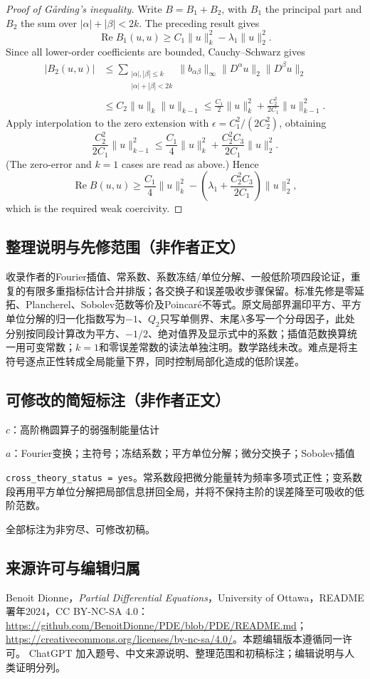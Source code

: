 \documentclass[UTF8,11pt]{ctexart}
\theoremstyle{definition}
\begin{document}
\begin{proof}[Proof of G\aa rding's inequality]
Write $B=B_1+B_2$, with $B_1$ the principal part and $B_2$ the sum over
$|\alpha|+|\beta|<2k$. The preceding result gives
\[
\operatorname{Re}B_1(u,u)\geq C_1\|u\|_k^2-\lambda_1\|u\|_2^2.
\]
Since all lower-order coefficients are bounded, Cauchy--Schwarz gives
\begin{align*}
|B_2(u,u)|
&\leq\sum_{\substack{|\alpha|,|\beta|\leq k\\|\alpha|+|\beta|<2k}}
 \|b_{\alpha\beta}\|_\infty\|D^\alpha u\|_2\|D^\beta u\|_2\\
&\leq C_2\|u\|_k\|u\|_{k-1}
\leq\frac{C_1}{2}\|u\|_k^2+\frac{C_2^2}{2C_1}\|u\|_{k-1}^2.
\end{align*}
Apply interpolation to the zero extension with
$\epsilon=C_1^2/(2C_2^2)$, obtaining
\[
\frac{C_2^2}{2C_1}\|u\|_{k-1}^2
\leq\frac{C_1}{4}\|u\|_k^2+\frac{C_2^2C_3}{2C_1}\|u\|_2^2.
\]
(The zero-error and $k=1$ cases are read as above.) Hence
\[
\operatorname{Re}B(u,u)\geq\frac{C_1}{4}\|u\|_k^2-
\left(\lambda_1+\frac{C_2^2C_3}{2C_1}\right)\|u\|_2^2,
\]
which is the required weak coercivity.
\end{proof}

\subsection*{整理说明与先修范围（非作者正文）}
收录作者的Fourier插值、常系数、系数冻结/单位分解、一般低阶项四段论证，重复的有限多重指标估计合并排版；各交换子和误差吸收步骤保留。标准先修是零延拓、Plancherel、Sobolev范数等价及Poincar\'e不等式。原文局部界漏印平方、平方单位分解的归一化指数写为$-1$、$Q_2$只写单侧界、末尾$\lambda$多写一个分母因子，此处分别按同段计算改为平方、$-1/2$、绝对值界及显示式中的系数；插值范数换算统一用可变常数；$k=1$和零误差常数的读法单独注明。数学路线未改。难点是将主符号逐点正性转成全局能量下界，同时控制局部化造成的低阶误差。
\subsection*{可修改的简短标注（非作者正文）}
$c$：高阶椭圆算子的弱强制能量估计

$a$：Fourier变换；主符号；冻结系数；平方单位分解；微分交换子；Sobolev插值

\texttt{cross\_theory\_status = yes}。常系数段把微分能量转为频率多项式正性；变系数段再用平方单位分解把局部信息拼回全局，并将不保持主阶的误差降至可吸收的低阶范数。

全部标注为非穷尽、可修改初稿。
\subsection*{来源许可与编辑归属}
Benoit Dionne，\emph{Partial Differential Equations}，University of Ottawa，README署年2024，CC BY-NC-SA 4.0：\url{https://github.com/BenoitDionne/PDE/blob/PDE/README.md}；\url{https://creativecommons.org/licenses/by-nc-sa/4.0/}。本题编辑版本遵循同一许可。
ChatGPT 加入题号、中文来源说明、整理范围和初稿标注；编辑说明与人类证明分列。
\end{document}
